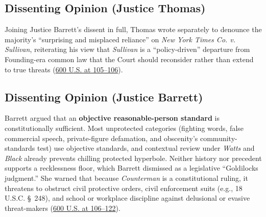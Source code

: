 \documentclass[12pt]{article}
\begin{document}
\subsection{Dissenting Opinion (Justice Thomas)}

Joining Justice Barrett's dissent in full, Thomas wrote separately to denounce the majority's ``surprising and misplaced reliance'' on \textit{New York Times Co. v. Sullivan}, reiterating his view that \textit{Sullivan} is a ``policy-driven'' departure from Founding-era common law that the Court should reconsider rather than extend to true threats (\href{https://supreme.justia.com/cases/federal/us/600/22-138/}{600 U.S. at 105--106}).

\subsection{Dissenting Opinion (Justice Barrett)}

Barrett argued that an \textbf{objective reasonable-person standard} is constitutionally sufficient. Most unprotected categories (fighting words, false commercial speech, private-figure defamation, and obscenity's community-standards test) use objective standards, and contextual review under \textit{Watts} and \textit{Black} already prevents chilling protected hyperbole. Neither history nor precedent supports a recklessness floor, which Barrett dismissed as a legislative ``Goldilocks judgment.'' She warned that because \textit{Counterman} is a constitutional ruling, it threatens to obstruct civil protective orders, civil enforcement suits (e.g., 18 U.S.C. \S~248), and school or workplace discipline against delusional or evasive threat-makers (\href{https://supreme.justia.com/cases/federal/us/600/22-138/}{600 U.S. at 106--122}).
\end{document}
